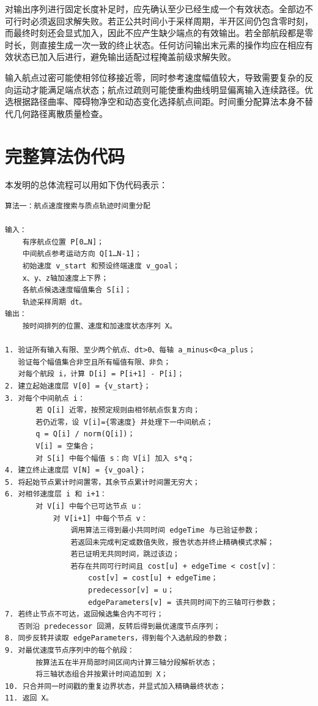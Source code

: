 \documentclass[UTF8,a4paper,12pt,fontset=fandol]{ctexart}
\begin{document}
对输出序列进行固定长度补足时，应先确认至少已经生成一个有效状态。全部边不可行时必须返回求解失败。若正公共时间小于采样周期，半开区间仍包含零时刻，而最终时刻还会显式加入，因此不应产生缺少端点的有效输出。若全部航段都是零时长，则直接生成一次一致的终止状态。任何访问输出末元素的操作均应在相应有效状态已加入后进行，避免输出适配过程掩盖前级求解失败。

输入航点过密可能使相邻位移接近零，同时参考速度幅值较大，导致需要复杂的反向运动才能满足端点状态；航点过疏则可能使重构曲线明显偏离输入连续路径。优选根据路径曲率、障碍物净空和动态变化选择航点间距。时间重分配算法本身不替代几何路径离散质量检查。

\section{完整算法伪代码}

本发明的总体流程可以用如下伪代码表示：

\begin{lstlisting}[style=patentpseudo]
算法一：航点速度搜索与质点轨迹时间重分配

输入：
    有序航点位置 P[0…N]；
    中间航点参考运动方向 Q[1…N-1]；
    初始速度 v_start 和预设终端速度 v_goal；
    x、y、z轴加速度上下界；
    各航点候选速度幅值集合 S[i]；
    轨迹采样周期 dt。
输出：
    按时间排列的位置、速度和加速度状态序列 X。

1. 验证所有输入有限、至少两个航点、dt>0、每轴 a_minus<0<a_plus；
   验证每个幅值集合非空且所有幅值有限、非负；
   对每个航段 i，计算 D[i] = P[i+1] - P[i]；
2. 建立起始速度层 V[0] = {v_start}；
3. 对每个中间航点 i：
       若 Q[i] 近零，按预定规则由相邻航点恢复方向；
       若仍近零，设 V[i]={零速度} 并处理下一中间航点；
       q = Q[i] / norm(Q[i])；
       V[i] = 空集合；
       对 S[i] 中每个幅值 s：向 V[i] 加入 s*q；
4. 建立终止速度层 V[N] = {v_goal}；
5. 将起始节点累计时间置零，其余节点累计时间置无穷大；
6. 对相邻速度层 i 和 i+1：
       对 V[i] 中每个已可达节点 u：
           对 V[i+1] 中每个节点 v：
               调用算法三得到最小共同时间 edgeTime 与已验证参数；
               若返回未完成判定或数值失败，报告状态并终止精确模式求解；
               若已证明无共同时间，跳过该边；
               若存在共同可行时间且 cost[u] + edgeTime < cost[v]：
                   cost[v] = cost[u] + edgeTime；
                   predecessor[v] = u；
                   edgeParameters[v] = 该共同时间下的三轴可行参数；
7. 若终止节点不可达，返回候选集合内不可行；
   否则沿 predecessor 回溯，反转后得到最优速度节点序列；
8. 同步反转并读取 edgeParameters，得到每个入选航段的参数；
9. 对最优速度节点序列中的每个航段：
       按算法五在半开局部时间区间内计算三轴分段解析状态；
       将三轴状态组合并按累计时间追加到 X；
10. 只合并同一时间戳的重复边界状态，并显式加入精确最终状态；
11. 返回 X。
\end{lstlisting}
\end{document}
